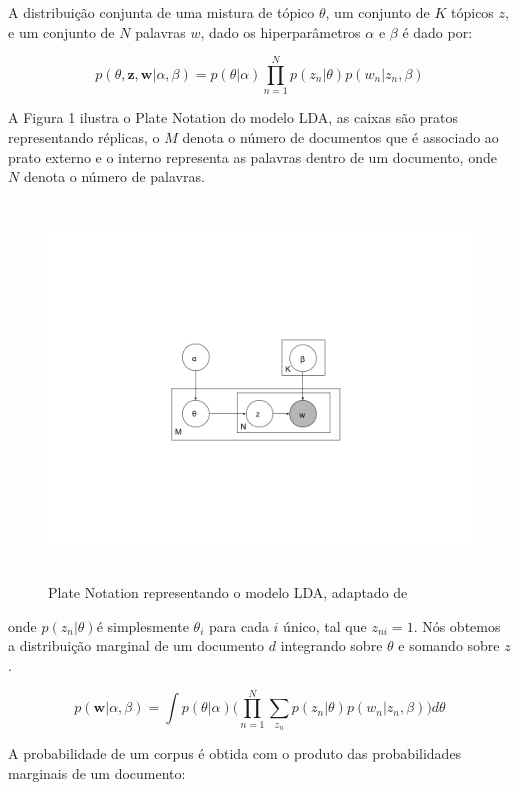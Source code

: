 \documentclass[12pt,a4paper]{article}
\begin{document}
  A distribuição conjunta de uma mistura de tópico $\theta$, um conjunto de $K$ tópicos $z$, e um conjunto de $N$ palavras $w$, dado os hiperparâmetros $\alpha$ e $\beta$ é dado por:
  
  
  \begin{equation}
  p(\theta,\textbf{z},\textbf{w}|\alpha,\beta) = p(\theta|\alpha) \prod_{n=1}^{N} p(z_n|\theta)p(w_n|z_n,\beta)
  \end{equation}
  
  
  A Figura 1 ilustra o Plate Notation do modelo LDA, as caixas são pratos representando réplicas, o $M$ denota o número de documentos que é associado ao prato externo e o interno representa as palavras dentro de um documento, onde $N$ denota o número de palavras.
  
  \begin{figure}[h]
    \centering
      \includegraphics[height=10cm]{images/figure_1.png}
      \caption{Plate Notation representando o modelo LDA, adaptado de }
  \end{figure}
  
  onde $p(z_n | \theta)$é simplesmente $\theta _i$ para cada $i$ único, tal que $z_{ni}=1$. Nós obtemos a distribuição marginal de um documento $d$ integrando sobre $\theta$ e somando sobre $z$.
  
  \begin{equation}
  p(\textbf{w}|\alpha,\beta)=\int{p(\theta|\alpha)\Bigg(\prod_{n=1}^{N}\sum_{z_n} p(z_n|\theta)p(w_n|z_n,\beta)\Bigg)d\theta}
  \end{equation}
  
  A probabilidade de um corpus é obtida com o produto das probabilidades marginais de um documento:
  
\end{document}
